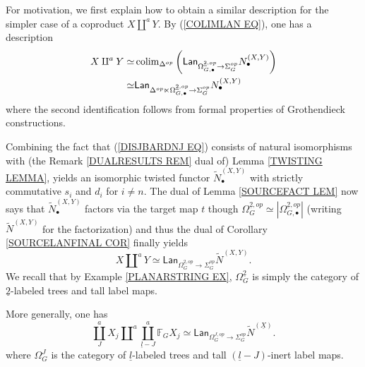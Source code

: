 \documentclass[a4paper,10pt]{article}%
\begin{document}
For motivation, we first explain how to obtain a similar description for the simpler case of a coproduct $X \amalg^a Y$.
By (\ref{COLIMLAN EQ}), one has a description 
\begin{align*}
	X \amalg^a Y \simeq  &
	\operatorname{colim}_{\Delta^{op}}
	\left(
	\mathsf{Lan}_{\Omega_{G,\bullet}^{\underline{2},op} \to \Sigma_G^{op}}
	N_{\bullet}^{(X,Y)}
	\right)
\\
	\simeq &
	\mathsf{Lan}_{\Delta^{op} \ltimes \Omega_{G,\bullet}^{\underline{2},op} \to \Sigma_G^{op}}
	N_{\bullet}^{(X,Y)}
\end{align*}
where the second identification follows from formal properties of Grothendieck constructions.

Combining the fact that (\ref{DISJBARDNJ EQ}) consists of natural isomorphisms with (the Remark \ref{DUALRESULTS REM} dual of) Lemma \ref{TWISTING LEMMA}, yields an isomorphic twisted functor $\tilde{N}_{\bullet}^{(X,Y)}$ with strictly commutative $s_i$ and $d_i$ for $i \neq n$. The dual of Lemma \ref{SOURCEFACT LEM} now says that $\tilde{N}_{\bullet}^{(X,Y)}$ factors via the target map $t$ though 
$\Omega_G^{\underline{2},op} \simeq
 |\Omega_{G,\bullet}^{\underline{2},op}|$
(writing $\tilde{N}^{(X,Y)}$ for the factorization)
and thus the dual of 
Corollary \ref{SOURCELANFINAL COR}
finally yields
\begin{equation}
	X \amalg^a Y \simeq 
	\mathsf{Lan}_{\Omega_{G}^{\underline{2},op} \to \Sigma_G^{op}}
	\tilde{N}^{(X,Y)}.
\end{equation}
We recall that by Example \ref{PLANARSTRING EX}, $\Omega_{G}^{\underline{2}}$ is simply the category of $\underline{2}$-labeled trees and tall label maps.

More generally, one has 
\begin{equation}\label{LANCOPRODDESC}
	\coprod^a_{J} X_j \amalg^a \coprod^a_{\underline{l}-J}
	\mathbb{F}_G X_j \simeq 
	\mathsf{Lan}_{\Omega_{G}^{J,op} \to \Sigma_G^{op}}
	\tilde{N}^{(\underline{X})}.
\end{equation}
where $\Omega_{G}^{J}$ is the category of $\underline{l}$-labeled trees and tall $(\underline{l}-J)$-inert label maps.
\end{document}
